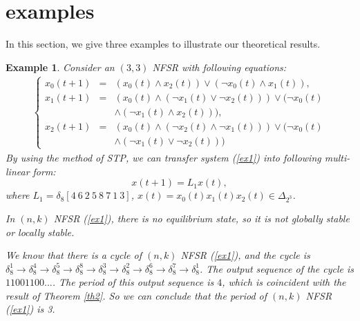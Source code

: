 \documentclass[conference]{IEEEtran}
\newtheorem{example}{Example}
\begin{document}
\section{examples}
In this section, we give three examples to illustrate our theoretical results.
\begin{example}
Consider an $(3,3)$ NFSR with following equations:
\begin{eqnarray}\label{ex1}
 \left\{ \begin{array}{lcl}
x_0(t+1)&=&(x_0(t)\wedge x_2(t))\vee (\neg x_0(t)\wedge x_1(t)),\\
x_1(t+1)&=&(x_0(t)\wedge (\neg x_1(t)\vee \neg x_2(t)))\vee(\neg x_0(t)\\
&&\wedge(\neg x_1(t)\wedge x_2(t))),\\
x_{2}(t+1)&=&(x_0(t)\wedge (\neg x_2(t)\wedge \neg x_1(t)))\vee(\neg x_0(t)\\
&&\wedge(\neg x_1(t)\vee \neg x_2(t)))
\end{array} \right.
\end{eqnarray}
By using the method of STP, we can transfer system (\ref{ex1}) into following multi-linear form:
\begin{equation}
x(t+1)=L_1x(t),
\end{equation}
where $L_1=\delta_{8}[4~6~2~5~8~7~1~3]$, $x(t)=x_0(t)x_1(t)x_2(t)\in \Delta_{2^3}$.

In $(n,k)$ NFSR (\ref{ex1}), there is no equilibrium state, so it is not globally stable or locally stable.

We know that there is a cycle of $(n,k)$ NFSR (\ref{ex1}), and the cycle is $\delta^1_8\rightarrow \delta^4_8\rightarrow \delta^5_8\rightarrow \delta^8_8\rightarrow \delta^3_8\rightarrow \delta^2_8\rightarrow \delta^6_8\rightarrow \delta^7_8\rightarrow \delta^1_8$. The output sequence of the cycle is $11001100...$. The period of this output sequence is $4$, which is coincident with the result of Theorem {\ref{th2}}. So we can conclude that the period of $(n,k)$ NFSR (\ref{ex1}) is 3.
\end{example}
\end{document}
